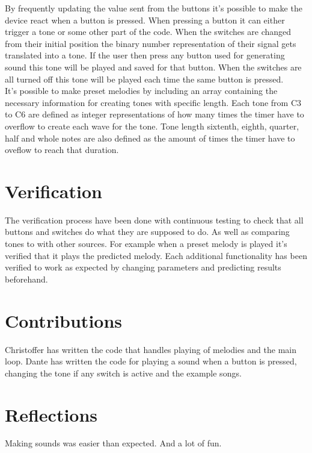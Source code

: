 \documentclass[a4paper]{article}
\begin{document}
By frequently updating the value sent from the buttons it's possible to make the device react when a button is pressed. When pressing a button it can either trigger a tone or some other part of the code. When the switches are changed from their initial position the binary number representation of their signal gets translated into a tone. If the user then press any button used for generating sound this tone will be played and saved for that button. When the switches are all turned off this tone will be played each time the same button is pressed.\\

It's possible to make preset melodies by including an array containing the necessary information for creating tones with specific length. Each tone from C3 to C6 are defined as integer representations of how many times the timer have to overflow to create each wave for the tone. Tone length sixtenth, eighth, quarter, half and whole notes are also defined as the amount of times the timer have to oveflow to reach that duration.

\section{Verification}

The verification process have been done with continuous testing to check that all buttons and switches do what they are supposed to do. As well as comparing tones to with other sources. For example when a preset melody is played it's verified that it plays the predicted melody. Each additional functionality has been verified to work as expected by changing parameters and predicting results beforehand.

\section{Contributions}
Christoffer has written the code that handles playing of melodies and the main loop. Dante has written the code for playing a sound when a button is pressed, changing the tone if any switch is active and the example songs.

\section{Reflections}
Making sounds was easier than expected. And a lot of fun.
\end{document}
